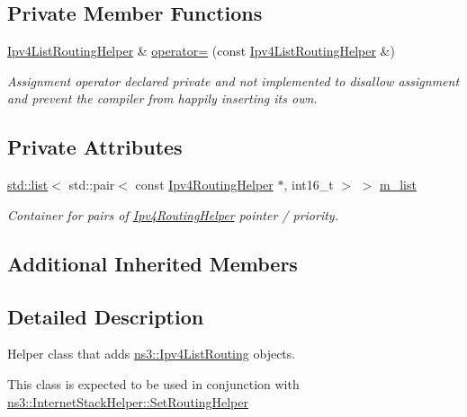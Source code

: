 \subsection*{Private Member Functions}
\begin{DoxyCompactItemize}
\item 
\hyperlink{classns3_1_1Ipv4ListRoutingHelper}{Ipv4\+List\+Routing\+Helper} \& \hyperlink{classns3_1_1Ipv4ListRoutingHelper_a70cbb9ad2fc00651a10583b87b989fa0}{operator=} (const \hyperlink{classns3_1_1Ipv4ListRoutingHelper}{Ipv4\+List\+Routing\+Helper} \&)
\begin{DoxyCompactList}\small\item\em Assignment operator declared private and not implemented to disallow assignment and prevent the compiler from happily inserting its own. \end{DoxyCompactList}\end{DoxyCompactItemize}
\subsection*{Private Attributes}
\begin{DoxyCompactItemize}
\item 
\hyperlink{openflow-interface_8h_afd9bcfa176617760671b67580f536fa7}{std\+::list}$<$ std\+::pair$<$ const \hyperlink{classns3_1_1Ipv4RoutingHelper}{Ipv4\+Routing\+Helper} $\ast$, int16\+\_\+t $>$ $>$ \hyperlink{classns3_1_1Ipv4ListRoutingHelper_acfed5974e83539a5daafa1ab6c388d3e}{m\+\_\+list}
\begin{DoxyCompactList}\small\item\em Container for pairs of \hyperlink{classns3_1_1Ipv4RoutingHelper}{Ipv4\+Routing\+Helper} pointer / priority. \end{DoxyCompactList}\end{DoxyCompactItemize}
\subsection*{Additional Inherited Members}


\subsection{Detailed Description}
Helper class that adds \hyperlink{classns3_1_1Ipv4ListRouting}{ns3\+::\+Ipv4\+List\+Routing} objects. 

This class is expected to be used in conjunction with \hyperlink{classns3_1_1InternetStackHelper_a3e382c02df022dec79952a7eca8cd5ba}{ns3\+::\+Internet\+Stack\+Helper\+::\+Set\+Routing\+Helper} 

